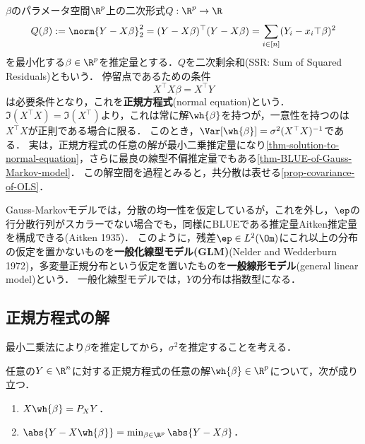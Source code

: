 \documentclass[uplatex,dvipdfmx]{jsreport}
\begin{document}
\begin{method}
    $\beta$のパラメータ空間$\R^p$上の二次形式$Q:\R^p\to\R$
    \[Q(\beta):=\norm{Y-X\beta}_2^2=(Y-X\beta)^\top(Y-X\beta)=\sum_{i\in[n]}(Y_i-x_i\top\beta)^2\]
    を最小化する$\beta\in\R^p$を推定量とする．$Q$を二次剰余和(SSR: Sum of Squared Residuals)ともいう．
    停留点であるための条件
    \[X^\top X\beta=X^\top Y\]
    は必要条件となり，これを\textbf{正規方程式}(normal equation)という．
    $\Im(X^\top X)=\Im(X^\top)$より，これは常に解$\wh{\beta}$を持つが，一意性を持つのは$X^\top X$が正則である場合に限る．
    このとき，$\Var[\wh{\beta}]=\sigma^2(X^\top X)^{-1}$である．
    実は，正規方程式の任意の解が最小二乗推定量になり\ref{thm-solution-to-normal-equation}，さらに最良の線型不偏推定量でもある\ref{thm-BLUE-of-Gauss-Markov-model}．
    この解空間を過程とみると，共分散は表せる\ref{prop-covariance-of-OLS}．
\end{method}
\begin{remarks}
    Gauss-Markovモデルでは，分散の均一性を仮定しているが，これを外し，$\ep$の行分散行列がスカラーでない場合でも，同様にBLUEである推定量Aitken推定量を構成できる(Aitken 1935)．
    このように，残差$\ep\in L^2(\Om)$にこれ以上の分布の仮定を置かないものを\textbf{一般化線型モデル(GLM)}(Nelder and Wedderburn 1972)，多変量正規分布という仮定を置いたものを\textbf{一般線形モデル}(general linear model)という．
    一般化線型モデルでは，$Y$の分布は指数型になる．
\end{remarks}

\subsection{正規方程式の解}

\begin{tcolorbox}[colframe=ForestGreen, colback=ForestGreen!10!white,breakable,colbacktitle=ForestGreen!40!white,coltitle=black,fonttitle=\bfseries\sffamily,
title=]
    最小二乗法により$\beta$を推定してから，$\sigma^2$を推定することを考える．
\end{tcolorbox}

\begin{theorem}\label{thm-solution-to-normal-equation}
    任意の$Y\in\R^n$に対する正規方程式の任意の解$\wh{\beta}\in\R^p$について，次が成り立つ．
    \begin{enumerate}
        \item $X\wh{\beta}=P_XY$．
        \item $\abs{Y-X\wh{\beta}}=\min_{\beta\in\R^p}\abs{Y-X\beta}$．
    \end{enumerate}
\end{theorem}
\end{document}
